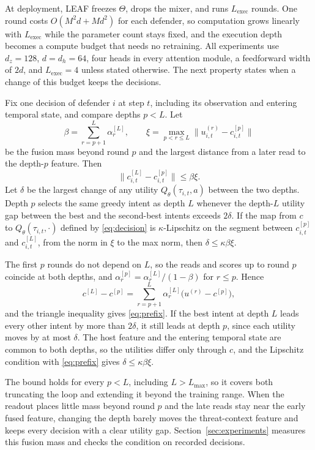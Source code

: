 At deployment, LEAF freezes $\Theta$, drops the mixer, and runs $L_{\mathrm{exec}}$ rounds. One round costs $O(M^2d+Md^2)$ for each defender, so computation grows linearly with $L_{\mathrm{exec}}$ while the parameter count stays fixed, and the execution depth becomes a compute budget that needs no retraining. All experiments use $d_z=128$, $d=d_h=64$, four heads in every attention module, a feedforward width of $2d$, and $L_{\mathrm{exec}}=4$ unless stated otherwise. The next property states when a change of this budget keeps the decisions.

\begin{proposition}
\label{prop:prefix}
Fix one decision of defender $i$ at step $t$, including its observation and entering temporal state, and compare depths $p<L$. Let
\begin{equation*}
\beta=\sum_{r=p+1}^{L}\alpha^{[L]}_{r},\qquad
\xi=\max_{p<r\le L}\big\|u^{(r)}_{i,t}-c^{[p]}_{i,t}\big\|
\end{equation*}
be the fusion mass beyond round $p$ and the largest distance from a later read to the depth-$p$ feature. Then
\begin{equation}
\big\|c^{[L]}_{i,t}-c^{[p]}_{i,t}\big\|\le\beta\xi.
\label{eq:prefix}
\end{equation}
Let $\delta$ be the largest change of any utility $Q_\theta(\tau_{i,t},a)$ between the two depths. Depth $p$ selects the same greedy intent as depth $L$ whenever the depth-$L$ utility gap between the best and the second-best intents exceeds $2\delta$. If the map from $c$ to $Q_\theta(\tau_{i,t},\cdot)$ defined by \eqref{eq:decision} is $\kappa$-Lipschitz on the segment between $c^{[p]}_{i,t}$ and $c^{[L]}_{i,t}$, from the norm in $\xi$ to the max norm, then $\delta\le\kappa\beta\xi$.
\end{proposition}

\begin{IEEEproof}
The first $p$ rounds do not depend on $L$, so the reads and scores up to round $p$ coincide at both depths, and $\alpha^{[p]}_{r}=\alpha^{[L]}_{r}/(1-\beta)$ for $r\le p$. Hence
\begin{equation*}
c^{[L]}-c^{[p]}=\sum_{r=p+1}^{L}\alpha^{[L]}_{r}\big(u^{(r)}-c^{[p]}\big),
\end{equation*}
and the triangle inequality gives \eqref{eq:prefix}. If the best intent at depth $L$ leads every other intent by more than $2\delta$, it still leads at depth $p$, since each utility moves by at most $\delta$. The host feature and the entering temporal state are common to both depths, so the utilities differ only through $c$, and the Lipschitz condition with \eqref{eq:prefix} gives $\delta\le\kappa\beta\xi$.
\end{IEEEproof}

The bound holds for every $p<L$, including $L>L_{\max}$, so it covers both truncating the loop and extending it beyond the training range. When the readout places little mass beyond round $p$ and the late reads stay near the early fused feature, changing the depth barely moves the threat-context feature and keeps every decision with a clear utility gap. Section~\ref{sec:experiments} measures this fusion mass and checks the condition on recorded decisions.
